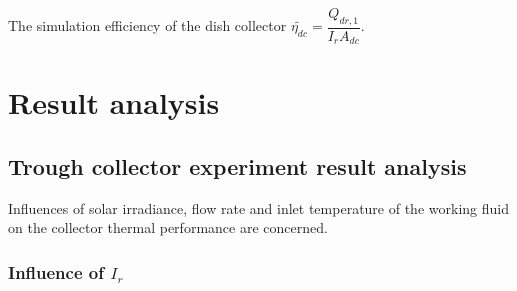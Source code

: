 The simulation efficiency of the dish collector $\widetilde{\eta_{dc}} = \dfrac{Q_{dr,1}}{I_r A_{dc}}$.

\section{Result analysis}
\subsection{Trough collector experiment result analysis}
Influences of solar irradiance, flow rate and inlet temperature of the working fluid on the collector thermal performance are concerned.
\subsubsection{Influence of $I_r$}

